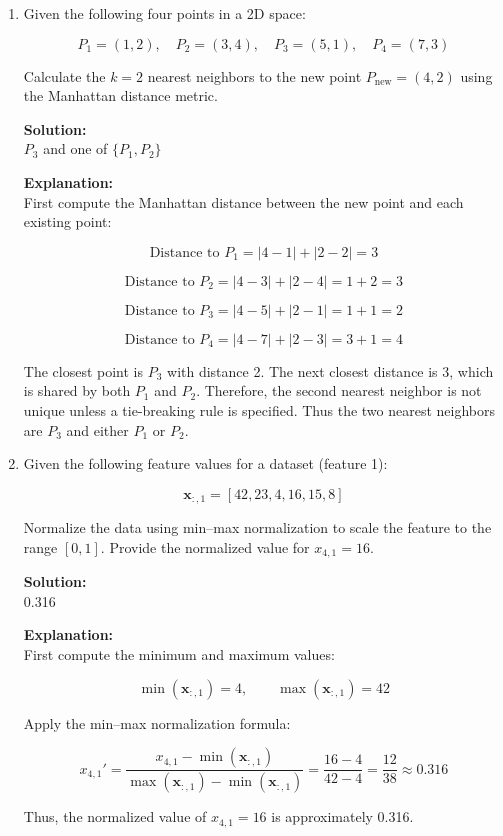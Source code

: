 \documentclass{article}
\begin{document}
\begin{enumerate}
\item Given the following four points in a 2D space:

\[
P_1 = (1,2), \quad P_2 = (3,4), \quad P_3 = (5,1), \quad P_4 = (7,3)
\]

Calculate the \(k=2\) nearest neighbors to the new point \(P_{\text{new}}=(4,2)\) using the Manhattan distance metric.

\textbf{Solution:} \\
\(P_3\) and one of \(\{P_1, P_2\}\)

\textbf{Explanation:} \\
First compute the Manhattan distance between the new point and each existing point:

\[
\text{Distance to } P_1 = |4-1| + |2-2| = 3
\]

\[
\text{Distance to } P_2 = |4-3| + |2-4| = 1+2 = 3
\]

\[
\text{Distance to } P_3 = |4-5| + |2-1| = 1+1 = 2
\]

\[
\text{Distance to } P_4 = |4-7| + |2-3| = 3+1 = 4
\]

The closest point is \(P_3\) with distance 2. The next closest distance is 3, which is shared by both \(P_1\) and \(P_2\). Therefore, the second nearest neighbor is not unique unless a tie-breaking rule is specified. Thus the two nearest neighbors are \(P_3\) and either \(P_1\) or \(P_2\).

\item Given the following feature values for a dataset (feature 1):

\[
\mathbf{x}_{:,1} = [42, 23, 4, 16, 15, 8]
\]

Normalize the data using min–max normalization to scale the feature to the range \([0,1]\). Provide the normalized value for \(x_{4,1}=16\).

\textbf{Solution:} \\
0.316

\textbf{Explanation:} \\
First compute the minimum and maximum values:

\[
\min(\mathbf{x}_{:,1}) = 4, \qquad \max(\mathbf{x}_{:,1}) = 42
\]

Apply the min–max normalization formula:

\[
x_{4,1}' =
\frac{x_{4,1}-\min(\mathbf{x}_{:,1})}
{\max(\mathbf{x}_{:,1})-\min(\mathbf{x}_{:,1})}
=
\frac{16-4}{42-4}
=
\frac{12}{38}
\approx 0.316
\]

Thus, the normalized value of \(x_{4,1}=16\) is approximately 0.316.


\end{enumerate}
\end{document}
